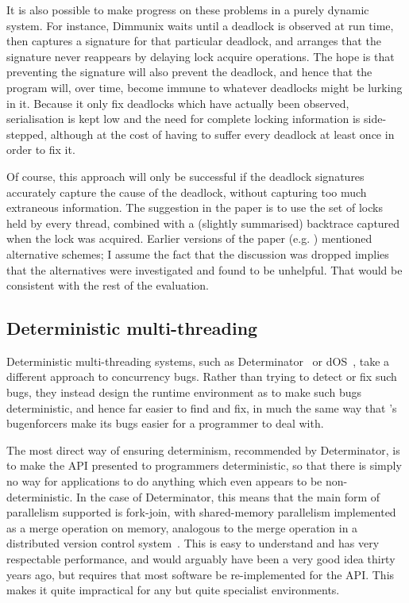 It is also possible to make progress on these problems in a purely
dynamic system.  For instance, Dimmunix\cite{Jula2008} waits until a
deadlock is observed at run time, then captures a signature for that
particular deadlock, and arranges that the signature never reappears
by delaying lock acquire operations.  The hope is that preventing the
signature will also prevent the deadlock, and hence that the program
will, over time, become immune to whatever deadlocks might be lurking
in it.  Because it only fix deadlocks which have actually been
observed, serialisation is kept low and the need for complete locking
information is side-stepped, although at the cost of having to suffer
every deadlock at least once in order to fix it.

Of course, this approach will only be successful if the deadlock
signatures accurately capture the cause of the deadlock, without
capturing too much extraneous information.  The suggestion in the
paper is to use the set of locks held by every thread, combined with a
(slightly summarised) backtrace captured when the lock was acquired.
Earlier versions of the paper (e.g. \cite{Jula2008b}) mentioned
alternative schemes; I assume the fact that the discussion was dropped
implies that the alternatives were investigated and found to be
unhelpful.  That would be consistent with the rest of the evaluation.

\subsection{Deterministic multi-threading}

Deterministic multi-threading systems, such as
Determinator~\cite{Aviram2010} or dOS~\cite{Bergan2010}, take a
different approach to concurrency bugs.  Rather than trying to detect
or fix such bugs, they instead design the runtime environment as to
make such bugs deterministic, and hence far easier to find and fix, in
much the same way that {\technique}'s \glspl{bugenforcer} make its
bugs easier for a programmer to deal with.

The most direct way of ensuring determinism, recommended by
Determinator, is to make the API presented to programmers
deterministic, so that there is simply no way for applications to do
anything which even appears to be non-deterministic.  In the case of
Determinator, this means that the main form of parallelism supported
is fork-join, with shared-memory parallelism implemented as a merge
operation on memory, analogous to the merge operation in a distributed
version control system~\cite{Hamano2013}.  This is easy to understand
and has very respectable performance, and would arguably have been a
very good idea thirty years ago, but requires that most software be
re-implemented for the API.  This makes it quite impractical for any
but quite specialist environments.

